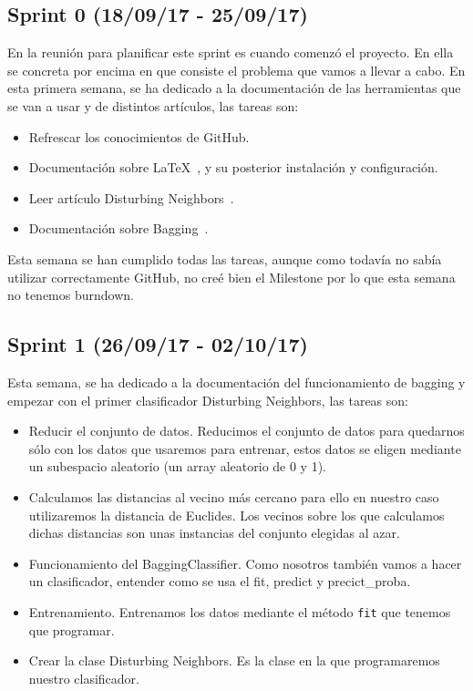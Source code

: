 \subsection{Sprint 0 (18/09/17 - 25/09/17)}
En la reunión para planificar este sprint es cuando comenzó el proyecto. En ella se concreta por encima en que consiste el problema que vamos a llevar a cabo.
En esta primera semana, se ha dedicado a la documentación de las herramientas que se van a usar y de distintos artículos, las tareas son:
\begin{itemize}
\item Refrescar los conocimientos de GitHub.
\item Documentación sobre \LaTeX~\cite{wiki:latex}, y su posterior instalación y configuración.
\item Leer artículo Disturbing Neighbors~\cite{disturbingneighbors}.
\item Documentación sobre Bagging~\cite{scikitlearn}.
\end{itemize}

Esta semana se han cumplido todas las tareas, aunque como todavía no sabía utilizar correctamente GitHub, no creé bien el Milestone por lo que esta semana no tenemos burndown.

\subsection{Sprint 1 (26/09/17 - 02/10/17)}
Esta semana, se ha dedicado a la documentación del funcionamiento de bagging y empezar con el primer clasificador Disturbing Neighbors, las tareas son:
\begin{itemize}
\item Reducir el conjunto de datos. Reducimos el conjunto de datos para quedarnos sólo con los datos que usaremos para entrenar, estos datos se eligen mediante un subespacio aleatorio (un array aleatorio de 0 y 1).
\item Calculamos las distancias al vecino más cercano para ello en nuestro caso utilizaremos la distancia de Euclides. Los vecinos sobre los que calculamos dichas distancias son unas instancias del conjunto elegidas al azar. 
\item Funcionamiento del BaggingClassifier. Como nosotros también vamos a hacer un clasificador, entender como se usa el fit, predict y precict\_proba.
\item Entrenamiento. Entrenamos los datos mediante el método \texttt{fit} que tenemos que programar.
\item Crear la clase Disturbing Neighbors. Es la clase en la que programaremos nuestro clasificador.
\end{itemize}


